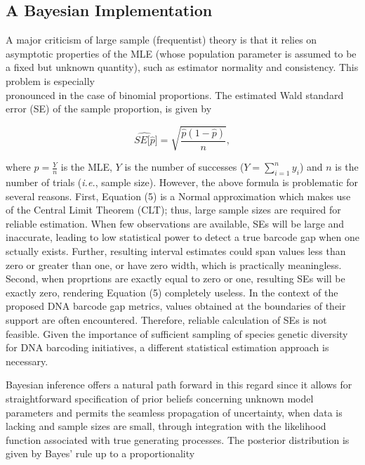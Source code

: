 \documentclass[12pt]{article}
\begin{document}
\subsection{A Bayesian Implementation}

A major criticism of large sample (frequentist) theory is that it relies on asymptotic properties of the MLE (whose population parameter is assumed to be a fixed but unknown quantity), such as estimator normality and consistency. This problem is especially \\ pronounced in the case of binomial proportions. The estimated Wald standard error (SE) of the sample proportion, is given by 

\begin{equation}
\widehat{SE[\hat{p}}] = \sqrt{\frac{\hat{p}(1 - \hat{p})}{n}},
\end{equation}

\noindent where $\hat{p} = \frac{Y}{n}$ is the MLE, $Y$ is the number of successes ($Y = \sum_{i=1}^n{y_i}$) and $n$ is the number of trials (\textit{i.e.}, sample size). However, the above formula is problematic for several reasons. First, Equation (5) is a Normal approximation which makes use of the Central Limit Theorem (CLT); thus, large sample sizes are required for reliable estimation. When few observations are available, SEs will be large and inaccurate, leading to low statistical power to detect a true barcode gap when one sctually exists. Further, resulting interval estimates could span values less than zero or greater than one, or have zero width, which is practically meaningless. Second, when proprtions are exactly equal to zero or one, resulting SEs will be exactly zero, rendering Equation (5) completely useless. In the context of the proposed DNA barcode gap metrics, values obtained at the boundaries of their support are often encountered. Therefore, reliable calculation of SEs is not feasible. Given the importance of sufficient sampling of species genetic diversity for DNA barcoding initiatives, a different statistical estimation approach is necessary. 

Bayesian inference offers a natural path forward in this regard since it allows for \\ straightforward specification of prior beliefs concerning unknown model parameters and permits the seamless propagation of uncertainty, when data is lacking and sample sizes are small, through integration with the likelihood function associated with true generating processes. The posterior distribution is given by Bayes' rule up to a proportionality
\end{document}
